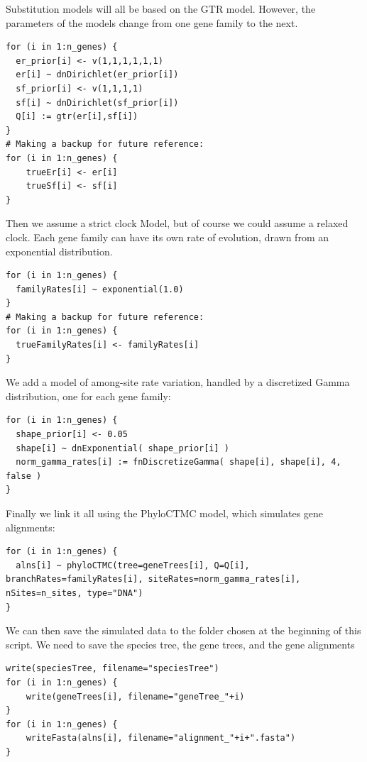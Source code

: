 \documentclass[11pt]{article}
\begin{document}
{\begin{framed}
Substitution models will all be based on the GTR model. However, the parameters of the models change from one gene family to the next.
 {\tt \begin{snugshade*}
\begin{lstlisting}
for (i in 1:n_genes) {
  er_prior[i] <- v(1,1,1,1,1,1)
  er[i] ~ dnDirichlet(er_prior[i])
  sf_prior[i] <- v(1,1,1,1)
  sf[i] ~ dnDirichlet(sf_prior[i])
  Q[i] := gtr(er[i],sf[i]) 
}
# Making a backup for future reference:
for (i in 1:n_genes) {
	trueEr[i] <- er[i]
	trueSf[i] <- sf[i]
}
\end{lstlisting}
\end{snugshade*}}

Then we assume a strict clock Model, but of course we could assume a relaxed clock.
Each gene family can have its own rate of evolution, drawn from an exponential distribution.
 {\tt \begin{snugshade*}
\begin{lstlisting}
for (i in 1:n_genes) {
  familyRates[i] ~ exponential(1.0)
}
# Making a backup for future reference:
for (i in 1:n_genes) {
  trueFamilyRates[i] <- familyRates[i] 
}
\end{lstlisting}
\end{snugshade*}}

We add a model of among-site rate variation, handled by a discretized Gamma distribution, one for each gene family:

 {\tt \begin{snugshade*}
\begin{lstlisting}
for (i in 1:n_genes) {
  shape_prior[i] <- 0.05 
  shape[i] ~ dnExponential( shape_prior[i] )
  norm_gamma_rates[i] := fnDiscretizeGamma( shape[i], shape[i], 4, false )
}
\end{lstlisting}
\end{snugshade*}}

Finally we link it all using the PhyloCTMC model, which simulates gene alignments:

 {\tt \begin{snugshade*}
\begin{lstlisting}
for (i in 1:n_genes) {
  alns[i] ~ phyloCTMC(tree=geneTrees[i], Q=Q[i],  branchRates=familyRates[i], siteRates=norm_gamma_rates[i], nSites=n_sites, type="DNA")
}
\end{lstlisting}
\end{snugshade*}}
We can then save the simulated data to the folder chosen at the beginning of this script.
We need to save the species tree, the gene trees, and the gene alignments

 {\tt \begin{snugshade*}
\begin{lstlisting}
write(speciesTree, filename="speciesTree")
for (i in 1:n_genes) {
	write(geneTrees[i], filename="geneTree_"+i)
}
for (i in 1:n_genes) {
	writeFasta(alns[i], filename="alignment_"+i+".fasta")
}
\end{lstlisting}
\end{snugshade*}}
\end{framed}}
\end{document}
